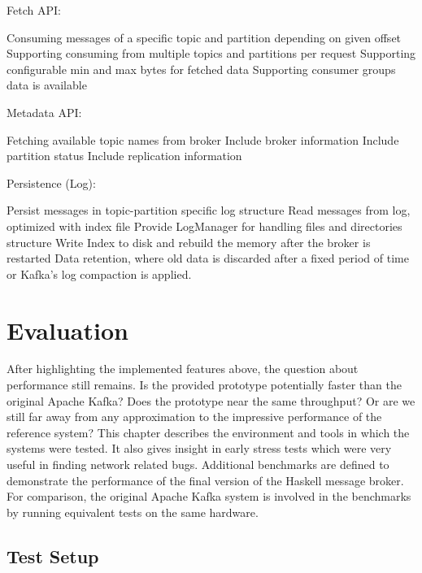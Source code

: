 Fetch API:
\begin{itemize}
        \tick Consuming messages of a specific topic and partition depending on given offset
        \fail Supporting consuming from multiple topics and partitions per request
        \fail Supporting configurable min and max bytes for fetched data
        \fail Supporting consumer groups
        data is available
\end{itemize}

Metadata API:
\begin{itemize}
        \tick Fetching available topic names from broker
        \tick Include broker information
        \fail Include partition status
        \fail Include replication information
\end{itemize}

Persistence (Log):
\begin{itemize}
        \tick Persist messages in topic-partition specific log structure
        \tick Read messages from log, optimized with index file
        \tick Provide LogManager for handling files and directories structure
        \fail Write Index to disk and rebuild the memory after the broker is restarted
        \fail Data retention, where old data is discarded after a fixed period of
            time or Kafka's log compaction is applied. 
\end{itemize}

\newpage
\section{Evaluation}

After highlighting the implemented features above, the question about
performance still remains. Is the provided prototype potentially faster than the
original Apache Kafka? Does the prototype near the same throughput? Or are we still far
away from any approximation to the impressive performance of the reference
system? This chapter describes the environment and tools in which the systems
were tested. It also gives insight in early stress tests which were very useful
in finding network related bugs. Additional benchmarks are defined to
demonstrate the performance of the final version of the Haskell message broker.
For comparison, the original Apache Kafka system is involved in the benchmarks
by running equivalent tests on the same hardware.

\subsection{Test Setup}

